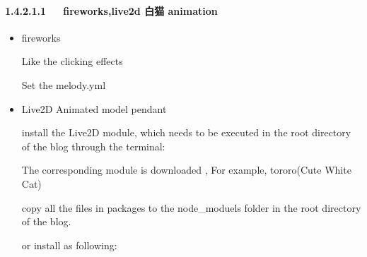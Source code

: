 \documentclass[letterpaper,12pt,english]{sphinxmanual}
\begin{document}
\paragraph{1.4.2.1.1   fireworks,live2d 白猫 animation}
\label{\detokenize{001software/001install/001._u7f51_u7ad9/hexo:fireworks-live2d-animation}}
\begin{itemize}
\item {} 
fireworks

Like the  clicking effects

Set the melody.yml

\begin{sphinxVerbatim}[commandchars=\\\{\}]
 
\end{sphinxVerbatim}

\item {} 
Live2D Animated model pendant

install the Live2D module, which needs to be executed in the root   directory of the blog through the terminal:

\begin{sphinxVerbatim}[commandchars=\\\{\}]
   
\end{sphinxVerbatim}

The corresponding module is downloaded  , For example,  tororo(Cute White Cat)

copy all the files in packages to the node\_moduels folder in the root directory of the blog.

or install as following:

\begin{sphinxVerbatim}[commandchars=\\\{\}]
  

          
\end{sphinxVerbatim}

\end{itemize}
\end{document}
